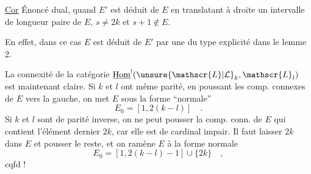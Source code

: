 \uline{Cor} \quad Énoncé dual, quand $E'$ est déduit de $E$ en translatant
à droite  un intervalle  de longueur paire  de $E$, 
$s\ne 2k$ et $s+1\notin E$.

En effet, dans ce cas $E$ est déduit de $E'$ par une  du
type explicité dans le lemme 2.

La connexité de la catégorie $\underline{\mathrm{Hom}}^{!}(\unsure{\mathscr{L}|\mathcal{L}}_k,\mathscr{L}_l)$ est
maintenant claire. Si $k$ et $l$ ont même parité,
en poussant les comp. connexes de $E$ vers la gauche,
on met $E$ sous la forme ``normale''
\[
E_0=[1,2(k-l)]\quad .
\]
Si $k$ et $l$ sont de parité inverse, on  ne peut
pousser  la comp. conn. de $E$ qui contient
l'élément dernier $2k$, car elle est de cardinal impair.
Il faut laisser $2k$ dans $E$ et pousser le reste, et
on ramène $E$ à la forme normale
\[
E_0=[1,2(k-l)-1]\cup\{2k\}\quad ,
\]
cqfd !

